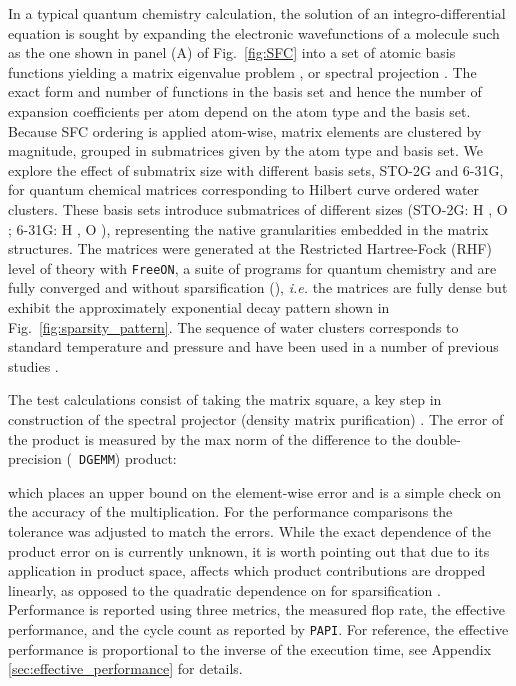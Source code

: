 In a typical quantum chemistry calculation, the solution of an
integro-differential equation is sought by expanding the electronic
wavefunctions of a molecule such as the one shown in panel (A) of
Fig.~\ref{fig:SFC} into a set of atomic basis functions yielding a matrix
eigenvalue problem \cite{szabo1996modern}, or spectral projection
\cite{McWeeny12061956, PhysRevB.58.12704, Challacombe:1999:DMM,
Challacombe:2000:SpMM, Benzi:2007:Decay, BenziDecay2012}.  The exact form and
number of functions in the basis set and hence the number of expansion
coefficients per atom depend on the atom type and the basis set.  Because SFC
ordering is applied atom-wise, matrix elements are clustered by magnitude,
grouped in submatrices given by the atom type and basis set. We explore the
effect of submatrix size with different basis sets, STO-2G and 6-31G,
for quantum chemical matrices corresponding to Hilbert curve ordered water
clusters. These basis sets introduce submatrices of different sizes (STO-2G: H
, O ; 6-31G: H , O ), representing the native granularities embedded in the matrix structures.
The matrices were generated at the Restricted Hartree-Fock (RHF) level of
theory with {\tt FreeON}, a suite of programs for  quantum
chemistry \cite{FreeON} and are fully converged and without sparsification
(), {\it i.e.} the matrices are fully dense but exhibit the
approximately exponential decay pattern shown in
Fig.~\ref{fig:sparsity_pattern}. The sequence of water clusters corresponds to
standard temperature and pressure and have been used in a number of previous
studies \cite{Challacombe:Review, Challacombe:1996:QCTCb,
Challacombe:1997:QCTC, burant:8969, ESchwegler97, millam:5569, daniels:425,
ochsenfeld:1663}.

The test calculations consist of taking the matrix square, a key step in
construction of the spectral projector (density matrix purification)
\cite{McWeeny12061956, PhysRevB.58.12704, Challacombe:1999:DMM,
Niklasson:2003:TRS4, Niklasson:2004:DMPT}.  The error of the product is
measured by the max norm of the difference to the double-precision ({\tt
DGEMM}) product:

which places an upper bound on the element-wise error and is a simple check on
the accuracy of the multiplication. For the performance comparisons the
tolerance was adjusted to match the errors. While the exact dependence of the
product error on  is currently unknown, it is worth pointing out that
due to its application in product space,  affects which product
contributions are dropped linearly, as opposed to the quadratic dependence on
 for sparsification \cite{ChallacombeBock2010}. Performance is
reported using three metrics, the measured flop rate, the effective
performance, and the cycle count as reported by {\tt PAPI}. For reference, the
effective performance is proportional to the inverse of the execution time,
see Appendix \ref{sec:effective_performance} for details.

